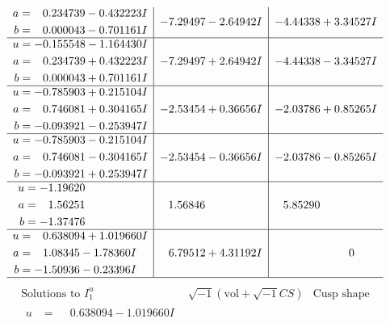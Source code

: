 \documentclass[1p]{elsarticle_modified}
\theoremstyle{definition}
\newcommand{\I}{\sqrt{-1}}
\begin{document}
$$\begin{array}{c|c|c}
\begin{aligned}
a &= \phantom{-}0.234739 - 0.432223 I \\
b &= \phantom{-}0.000043 - 0.701161 I\end{aligned}
 & -7.29497 - 2.64942 I & -4.44338 + 3.34527 I \\ \hline\begin{aligned}
u &= -0.155548 - 1.164430 I \\
a &= \phantom{-}0.234739 + 0.432223 I \\
b &= \phantom{-}0.000043 + 0.701161 I\end{aligned}
 & -7.29497 + 2.64942 I & -4.44338 - 3.34527 I \\ \hline\begin{aligned}
u &= -0.785903 + 0.215104 I \\
a &= \phantom{-}0.746081 + 0.304165 I \\
b &= -0.093921 - 0.253947 I\end{aligned}
 & -2.53454 + 0.36656 I & -2.03786 + 0.85265 I \\ \hline\begin{aligned}
u &= -0.785903 - 0.215104 I \\
a &= \phantom{-}0.746081 - 0.304165 I \\
b &= -0.093921 + 0.253947 I\end{aligned}
 & -2.53454 - 0.36656 I & -2.03786 - 0.85265 I \\ \hline\begin{aligned}
u &= -1.19620\phantom{ +0.000000I} \\
a &= \phantom{-}1.56251\phantom{ +0.000000I} \\
b &= -1.37476\phantom{ +0.000000I}\end{aligned}
 & \phantom{-}1.56846\phantom{ +0.000000I} & \phantom{-}5.85290\phantom{ +0.000000I} \\ \hline\begin{aligned}
u &= \phantom{-}0.638094 + 1.019660 I \\
a &= \phantom{-}1.08345 - 1.78360 I \\
b &= -1.50936 - 0.23396 I\end{aligned}
 & \phantom{-}6.79512 + 4.31192 I & \phantom{-0.000000 } 0\\
 \hline 
 \end{array}$$\newpage$$\begin{array}{c|c|c}  
\text{Solutions to }I^u_{1}& \I (\text{vol} + \sqrt{-1}CS) & \text{Cusp shape}\\
 \hline 
\begin{aligned}
u &= \phantom{-}0.638094 - 1.019660 I \\

\end{aligned}
\end{array}$$
\end{document}
